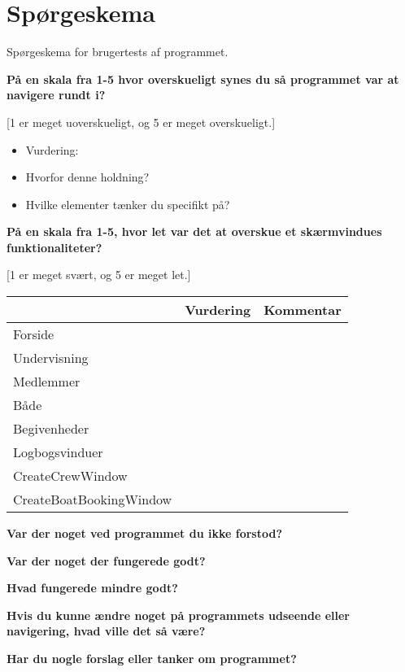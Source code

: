 \chapter{Spørgeskema}\label{bilag:SporgeSkema}
Spørgeskema for brugertests af programmet.

\textbf{På en skala fra 1-5 hvor overskueligt synes du så programmet var at navigere rundt i?}

[1 er meget uoverskueligt, og 5 er meget overskueligt.]

\begin{itemize}
\item Vurdering: 
\item Hvorfor denne holdning? 
\item Hvilke elementer tænker du specifikt på?
\end{itemize}

\textbf{På en skala fra 1-5, hvor let var det at overskue et skærmvindues funktionaliteter?}

[1 er meget svært, og 5 er meget let.]

\begin{table}[H]\label{TabelVurdering}
    \begin{tabular}{l|l|l}
    ~                       & Vurdering & Kommentar \\ \hline
    Forside                 & ~         & ~         \\
    Undervisning            & ~         & ~         \\
    Medlemmer               & ~         & ~         \\
    Både                    & ~         & ~         \\
    Begivenheder            & ~         & ~         \\
    Logbogsvinduer          & ~         & ~         \\
    CreateCrewWindow        & ~         & ~         \\
    CreateBoatBookingWindow & ~         & ~         \\
    \end{tabular}
\end{table}

\textbf{Var der noget ved programmet du ikke forstod?}

\textbf{Var der noget der fungerede godt?}

\textbf{Hvad fungerede mindre godt?}

\textbf{Hvis du kunne ændre noget på programmets udseende eller navigering, hvad ville det så være?}

\textbf{Har du nogle forslag eller tanker om programmet?}
